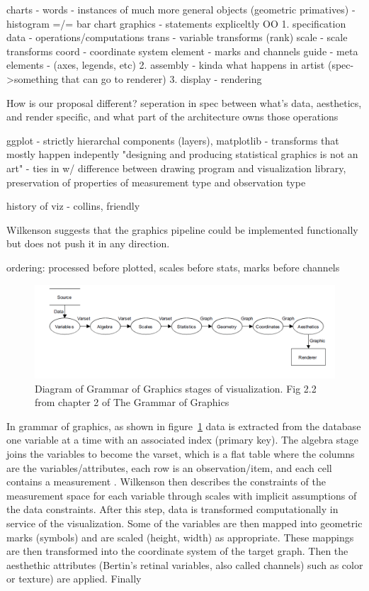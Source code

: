 \documentclass[letterpaper,onecolumn,titlepage]{Ythesis}
\begin{document}
\cite{wilkinsonGrammarGraphicsStatistics2005}
charts - words 
    - instances of much more general objects (geometric primatives)
    - histogram =/= bar chart
graphics - statements 
expliceltly OO
    1. specification
        data - operations/computations
        trans - variable transforms (rank)
        scale - scale transforms
        coord - coordinate system
        element - marks and channels
        guide - meta elements - (axes, legends, etc)
    2. assembly - kinda what happens in artist (spec->something that can go to renderer) 
    3. display - rendering

How is our proposal different? seperation in spec between what's data, aesthetics, and render specific, and what part of the architecture owns those operations


ggplot - strictly hierarchal components (layers), matplotlib - transforms that mostly happen indepently 
"designing and producing statistical graphics is not an art" - ties in w/ difference between drawing program and visualization library, preservation of properties of measurement type and observation type

\cite{wickhamGgplot2ElegantGraphics2016}

history of viz - collins, friendly


Wilkenson suggests that the graphics pipeline could be implemented functionally but does not push it in any direction. 

ordering: processed before plotted, 
scales before stats, marks before channels
\begin{figure}
\includegraphics[]{figures/intro/gog_pathway.png}
\caption{Diagram of Grammar of Graphics stages of visualization. Fig 2.2 from chapter 2 of The Grammar of Graphics\cite{wilkinsonGrammarGraphics2005}}
\label{fig:gog_pathway}
\end{figure}
In grammar of graphics, as shown in figure~\ref{fig:gog_pathway} data is extracted from the database one variable at a time with an associated index (primary key). The algebra stage joins the variables to become the varset, which is a flat table where the columns are the variables/attributes, each row is an observation/item, and each cell contains a measurement \cite{munznerChDataAbstraction}. Wilkenson then describes the constraints of the measurement space for each variable through scales \cite{wilkinsonGrammarGraphics2005} with implicit assumptions of the data constraints. After this step, data is transformed computationally in service of the visualization. Some of the variables are then mapped into geometric marks (symbols) and are scaled (height, width) as appropriate. These mappings are then transformed into the coordinate system of the target graph. Then the aesthethic attributes (Bertin's retinal variables, also called channels) such as color or  texture) are applied. Finally
\end{document}
